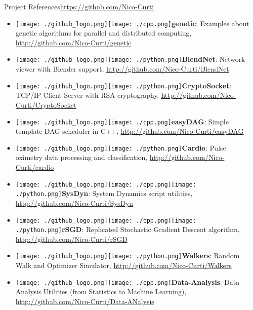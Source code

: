 \documentclass[10pt, technote, oribibl, unicode]{beamer}
\begin{document}
\begin{frame}{Project References}{\url{https://github.com/Nico-Curti}}
\begin{itemize}
    \item[] \texttt{[image: ./github\_logo.png]}\quad\texttt{[image: ./cpp.png]}\quad \textbf{genetic}: Examples about genetic algorithms for parallel and distributed computing, \url{http://github.com/Nico-Curti/genetic}

    \item[] \texttt{[image: ./github\_logo.png]}\quad\texttt{[image: ./python.png]}\quad \textbf{BlendNet}: Network viewer with Blender support, \url{http://github.com/Nico-Curti/BlendNet}

    \item[] \texttt{[image: ./github\_logo.png]}\quad\texttt{[image: ./python.png]}\quad \textbf{CryptoSocket}: TCP/IP Client Server with RSA cryptography, \url{http://github.com/Nico-Curti/CryptoSocket}

    \item[] \texttt{[image: ./github\_logo.png]}\quad\texttt{[image: ./cpp.png]}\quad \textbf{easyDAG}: Simple template DAG scheduler in C++, \url{http://github.com/Nico-Curti/easyDAG}

    \item[] \texttt{[image: ./github\_logo.png]}\quad\texttt{[image: ./python.png]}\quad \textbf{Cardio}: Pulse oximetry data processing and classification, \url{http://github.com/Nico-Curti/cardio}

    \item[] \texttt{[image: ./github\_logo.png]}\quad\texttt{[image: ./cpp.png]}\quad\texttt{[image: ./python.png]}\quad \textbf{SysDyn}: System Dynamics script utilities, \url{http://github.com/Nico-Curti/SysDyn}

    \item[] \texttt{[image: ./github\_logo.png]}\quad\texttt{[image: ./cpp.png]}\quad\texttt{[image: ./python.png]}\quad \textbf{rSGD}: Replicated Stochastic Gradient Descent algorithm, \url{http://github.com/Nico-Curti/rSGD}


    \item[] \texttt{[image: ./github\_logo.png]}\quad\texttt{[image: ./python.png]}\quad \textbf{Walkers}: Random Walk and Optimizer Simulator, \url{http://github.com/Nico-Curti/Walkers}

    \item[] \texttt{[image: ./github\_logo.png]}\quad\texttt{[image: ./cpp.png]}\quad \textbf{Data-Analysis}: Data Analysis Utilities (from Statistics to Machine Learning), \url{http://github.com/Nico-Curti/Data-ANalysis}

  \end{itemize}

\end{frame}
\end{document}
